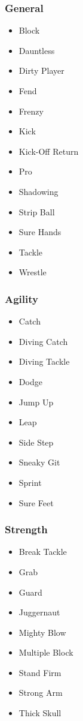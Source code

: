 \begin{multicols}{3}

\begin{samepage}
\subsubsection{General}
\begin{itemize}
\item[] Block
\item[] Dauntless
\item[] Dirty Player
\item[] Fend
\item[] Frenzy
\item[] Kick
\item[] Kick-Off Return
\item[] Pro
\item[] Shadowing
\item[] Strip Ball
\item[] Sure Hands
\item[] Tackle
\item[] Wrestle
\end{itemize}
\end{samepage}

\begin{samepage}
\subsubsection{Agility}
\begin{itemize}
\item[] Catch
\item[] Diving Catch
\item[] Diving Tackle
\item[] Dodge
\item[] Jump Up
\item[] Leap
\item[] Side Step
\item[] Sneaky Git
\item[] Sprint
\item[] Sure Feet
\end{itemize}
\end{samepage}

\columnbreak

\begin{samepage}
\subsubsection{Strength}
\begin{itemize}
\item[] Break Tackle
\item[] Grab
\item[] Guard
\item[] Juggernaut
\item[] Mighty Blow
\item[] Multiple Block
\item[] Stand Firm
\item[] Strong Arm
\item[] Thick Skull
\end{itemize}
\end{samepage}


\end{multicols}
